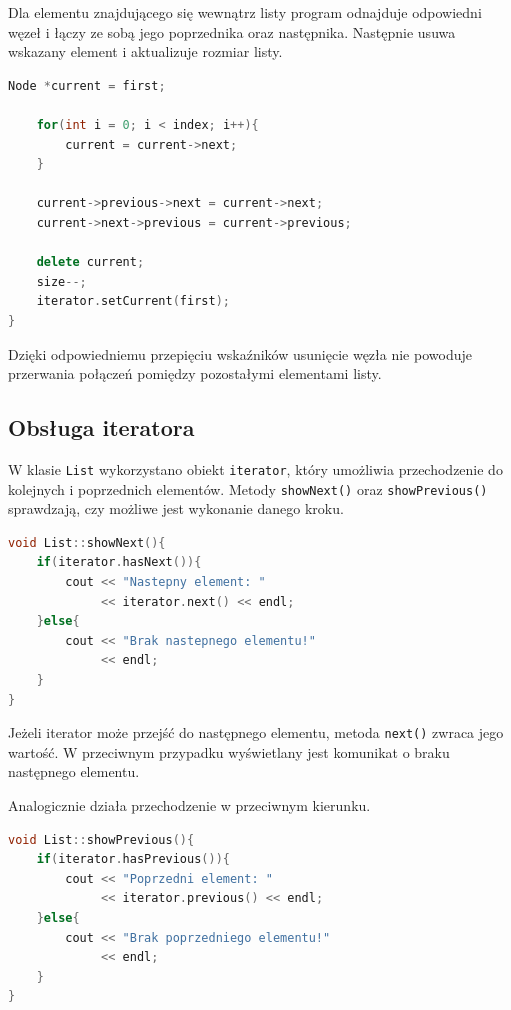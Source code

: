 Dla elementu znajdującego się wewnątrz listy program odnajduje odpowiedni węzeł i łączy ze sobą jego poprzednika oraz następnika. Następnie usuwa wskazany element i aktualizuje rozmiar listy.

\begin{lstlisting}[language=C++, caption={Usuwanie elementu ze środka listy}]
    Node *current = first;

    for(int i = 0; i < index; i++){
        current = current->next;
    }

    current->previous->next = current->next;
    current->next->previous = current->previous;

    delete current;
    size--;
    iterator.setCurrent(first);
}
\end{lstlisting}

Dzięki odpowiedniemu przepięciu wskaźników usunięcie węzła nie powoduje przerwania połączeń pomiędzy pozostałymi elementami listy.

\subsection{Obsługa iteratora}

W klasie \texttt{List} wykorzystano obiekt \texttt{iterator}, który umożliwia przechodzenie do kolejnych i poprzednich elementów. Metody \texttt{showNext()} oraz \texttt{showPrevious()} sprawdzają, czy możliwe jest wykonanie danego kroku.

\begin{lstlisting}[language=C++, caption={Przejście do następnego elementu}]
void List::showNext(){
    if(iterator.hasNext()){
        cout << "Nastepny element: "
             << iterator.next() << endl;
    }else{
        cout << "Brak nastepnego elementu!"
             << endl;
    }
}
\end{lstlisting}

Jeżeli iterator może przejść do następnego elementu, metoda \texttt{next()} zwraca jego wartość. W przeciwnym przypadku wyświetlany jest komunikat o braku następnego elementu.

Analogicznie działa przechodzenie w przeciwnym kierunku.

\begin{lstlisting}[language=C++, caption={Przejście do poprzedniego elementu}]
void List::showPrevious(){
    if(iterator.hasPrevious()){
        cout << "Poprzedni element: "
             << iterator.previous() << endl;
    }else{
        cout << "Brak poprzedniego elementu!"
             << endl;
    }
}
\end{lstlisting}

